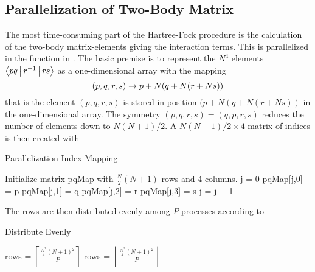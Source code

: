 \subsection{Parallelization of Two-Body Matrix}
    The most time-consuming part of the Hartree-Fock procedure is the
    calculation of the two-body matrix-elements giving the interaction terms.
    This is parallelized in the  function in
    . The basic premise is to represent the $N^4$
    elements $\Braket{pq|r^{-1}|rs}$ as a one-dimensional array with the mapping
        \begin{equation}
            (p,q,r,s) \rightarrow p + N(q + N(r + Ns))
        \end{equation}
    that is the element $(p,q,r,s)$ is stored in position $(p + N(q + N(r +
    Ns))$ in the one-dimensional array. The symmetry $(p,q,r,s)=(q,p,r,s)$
    reduces the number of elements down to $N(N+1)/2$. A $N(N+1)/2\times 4$
    matrix of indices is then created with
        \begin{algorithm}[H]
            \caption{Parallelization Index Mapping}\label{alg:paraindiexmap}
            \begin{algorithmic}[H]
                \State Initialize matrix pqMap with $\frac{N}{2}(N+1)$ rows and
                $4$ columns.
                \State j = 0
                                \State pqMap[j,0] = p
                                \State pqMap[j,1] = q
                                \State pqMap[j,2] = r
                                \State pqMap[j,3] = s
                                \State j = j + 1
                            \EndFor
                        \EndFor
                    \EndFor
                \EndFor
            \end{algorithmic}
        \end{algorithm}
    The rows are then distributed evenly among $P$ processes according to
        \begin{algorithm}[H]
            \caption{Distribute Evenly}\label{alg:paraeven}
            \begin{algorithmic}[H]
                    \State rows =
                    $\left\lceil\frac{\frac{N^2}{4}(N+1)^2}{P}\right\rceil$
                \Else
                    \State rows =
                    $\left\lfloor\frac{\frac{N^2}{4}(N+1)^2}{P}\right\rfloor$
                \EndIf
            \end{algorithmic}
        \end{algorithm}
